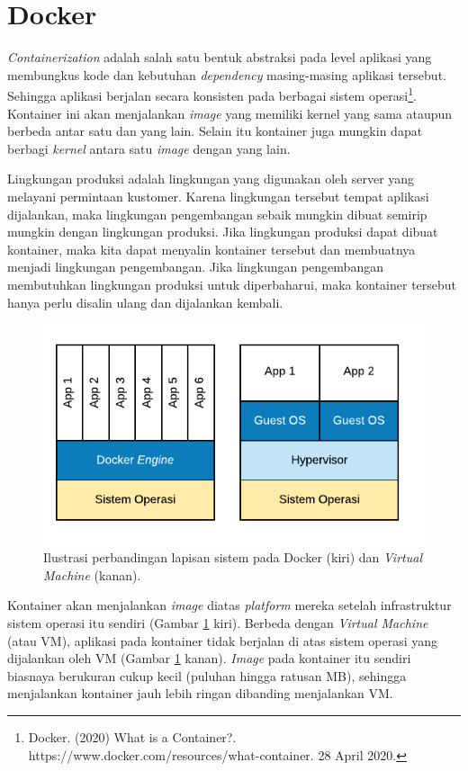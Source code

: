 \section{Docker}
    \textit{Containerization} adalah salah satu bentuk abstraksi pada level
    aplikasi yang membungkus kode dan kebutuhan \textit{dependency}
    masing-masing aplikasi tersebut. Sehingga aplikasi berjalan secara konsisten
    pada berbagai sistem operasi\footnote{Docker. (2020) What is a Container?.
    https://www.docker.com/resources/what-container. 28 April 2020.}. Kontainer
    ini akan menjalankan \textit{image} yang memiliki kernel yang sama ataupun
    berbeda antar satu dan yang lain. Selain itu kontainer juga mungkin dapat
    berbagi \textit{kernel} antara satu \textit{image} dengan yang lain.
    
    Lingkungan produksi adalah lingkungan yang digunakan oleh server yang
    melayani permintaan kustomer. Karena lingkungan tersebut tempat aplikasi
    dijalankan, maka lingkungan pengembangan sebaik mungkin dibuat semirip
    mungkin dengan lingkungan produksi. Jika lingkungan produksi dapat
    dibuat kontainer, maka kita dapat menyalin kontainer tersebut dan membuatnya
    menjadi lingkungan pengembangan. Jika lingkungan pengembangan membutuhkan
    lingkungan produksi untuk diperbaharui, maka kontainer tersebut hanya perlu
    disalin ulang dan dijalankan kembali.
    
    \begin{figure}[H]
        \centering
        \includegraphics{Gambar/illust-docker.pdf}
        \caption{Ilustrasi perbandingan lapisan sistem pada Docker (kiri) dan
        \textit{Virtual Machine} (kanan).}
        \label{fig:illust-docker}
    \end{figure}
    
    Kontainer akan menjalankan \textit{image} diatas \textit{platform} mereka
    setelah infrastruktur sistem operasi itu sendiri (Gambar
    \ref{fig:illust-docker} kiri). Berbeda dengan \textit{Virtual Machine} (atau
    VM), aplikasi pada kontainer tidak berjalan di atas sistem operasi yang
    dijalankan oleh VM (Gambar \ref{fig:illust-docker} kanan). \textit{Image}
    pada kontainer itu sendiri biasnaya berukuran cukup kecil (puluhan hingga
    ratusan MB), sehingga menjalankan kontainer jauh lebih ringan dibanding
    menjalankan VM.
    
